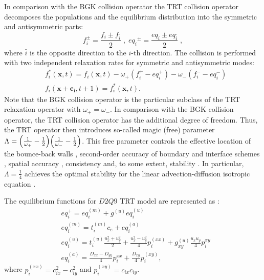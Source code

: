 \documentclass{article}
\begin{document}
In
comparison with the BGK collision operator the TRT collision operator \cite{ginzburg-boundary-main}
decomposes the populations and the equilibrium
distribution into the symmetric and antisymmetric parts:
\begin{equation}
\label{trtdecomp}
f^{\pm}_i=\frac{f_i\pm f_{\bar{i}}}{2}\;,\; 
{eq_i}^{\pm}=\frac{eq_i\pm eq_{\bar{i}}}{2}\;,
\end{equation}
where $\bar{i}$ is the opposite direction to the $i$-th direction.
The collision is performed with two independent relaxation rates for 
symmetric and antisymmetric modes:
\begin{equation}
\label{trt}
\begin{aligned}
&f_i^{*}(\bm{x},t)=f_i(\bm{x},t)-\omega_{+} (f_i^{+} - eq_i^+)-\omega_{-}
(f_i^{-} -
eq_i^-)\\
&f_i(\bm{x}+\bm{c_i},t+1)=f_i^{*}(\bm{x},t).
\end{aligned}
\end{equation}
Note that the BGK collision operator is the particular subclass of the TRT relaxation operator with
$\omega_{+}=\omega_{-}$. In comparison with the BGK collision operator,
the TRT collision operator has the additional degree of freedom. Thus, the TRT operator then
introduces
so-called magic (free) parameter
$\Lambda=\Bigl(\frac{1}{\omega_{+}}-\frac{1}{2}\Bigr)\Bigl(\frac{1}{\omega_{-}}-\frac{1}{2}\Bigr)$. 
This free parameter controls the effective location of the bounce-back
walls \cite{ginzburg-multireflection}, second-order accuracy of
boundary \cite{ginzburg-boundary-main} and interface schemes \cite{ginzburg-discontinious}, 
spatial accuracy \cite{ginzburg-recurrence,servan-trt-stability},
consistency \cite{ginzburg-brinkman} and, to some extent,
stability \cite{kuzmin-stability-optimal,kuzmin-d1q3,servan-trt-stability}.
In particular, $\Lambda=\frac{1}{4}$ achieves the optimal stability for the
linear advection-diffusion isotropic equation \cite{kuzmin-stability-optimal}. 

The equilibrium functions for $D2Q9$ TRT model are represented as \cite{kuzmin-stability-optimal}:
\begin{equation}
\begin{aligned}
&eq_i^{+}=eq_i^{(m)}+g^{(u)} eq_i^{(u)}\\
&eq_i^{(m)}=t_i^{(m)} c_e+ eq_i^{(a)}\\
&eq_i^{(u)}=t_i^{(u)} \frac{u_x^2+u_y^2}{2}+\frac{u_x^2-u_y^2}{4} p_i^{(xx)}+g_{xy}^{(u)}\frac{u_x
u_y}{4} p_i^{xy}\\
&eq_i^{(a)}=\frac{D_{xx}-D_{yy}}{4} p_i^{xx}+\frac{D_{xy}}{4} p_i^{(xy)},
\end{aligned}
\end{equation}
where $p_i^{(xx)}=c_{ix}^2-c_{iy}^2$ and $p_i^{(xy)}=c_{ix} c_{iy}$. 
\end{document}
